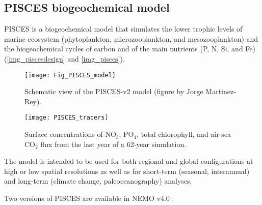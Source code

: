 \documentclass[../main/TOP_manual]{subfiles}
\begin{document}
\subsection{PISCES biogeochemical model}

PISCES is a biogeochemical model that simulates the lower trophic levels of marine ecosystem (phytoplankton, microzooplankton, and mesozooplankton) and the biogeochemical cycles of carbon and of the main nutrients (P, N, Si, and Fe) (\autoref{img_piscesdesign} and \autoref{img_pisces}).

\begin{figure}[ht]
	\begin{center}
		\vspace{0cm}
		\texttt{[image: Fig\_PISCES\_model]}
		\caption{Schematic view of the PISCES-v2 model (figure by Jorge Martinez-Rey).}
		\label{img_piscesdesign}
	\end{center}
\end{figure}

\begin{figure}[!h]
	\centering
	\texttt{[image: PISCES\_tracers]}
	\caption{Surface concentrations of NO$_{3}$, PO$_{4}$, total chlorophyll, and air-sea CO$_{2}$ flux from the last year of a 62-year simulation.}
	\label{img_pisces}
\end{figure}

The  model is intended to be used for both regional and global configurations at high or low spatial resolutions as well as for short-term (seasonal, interannual) and long-term (climate change, paleoceanography) analyses. 

Two versions of PISCES are available in NEMO v4.0 :
\end{document}
